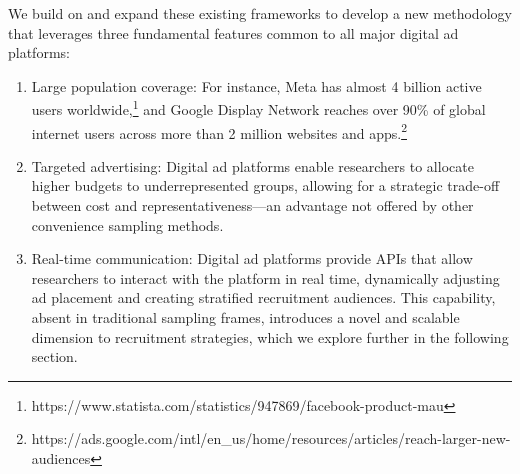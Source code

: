 \documentclass[letterpaper,12pt]{article}
\theoremstyle{proposition}
\begin{document}
We build on and expand these existing frameworks to develop a new methodology that leverages three fundamental features common to all major digital ad platforms:


\begin{enumerate}
\item Large population coverage: For instance, Meta has almost 4 billion active users worldwide,\footnote{https://www.statista.com/statistics/947869/facebook-product-mau} and Google Display Network reaches over 90\% of global internet users across more than 2 million websites and apps.\footnote{https://ads.google.com/intl/en\_us/home/resources/articles/reach-larger-new-audiences}

\item Targeted advertising: Digital ad platforms enable researchers to allocate higher budgets to underrepresented groups, allowing for a strategic trade-off between cost and representativeness---an advantage not offered by other convenience sampling methods.

\item Real-time communication: Digital ad platforms provide APIs that allow researchers to interact with the platform in real time, dynamically adjusting ad placement and creating stratified recruitment audiences. This capability, absent in traditional sampling frames, introduces a novel and scalable dimension to recruitment strategies, which we explore further in the following section.
\end{enumerate}





\end{document}
